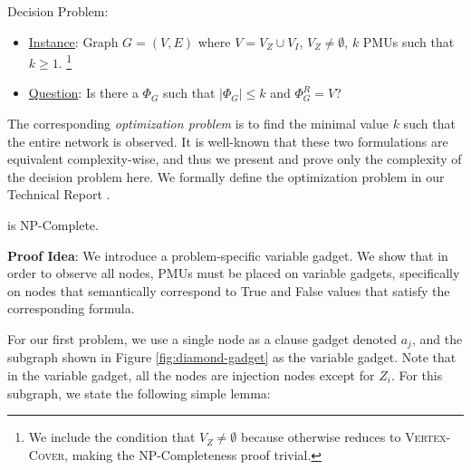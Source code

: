 \full Decision Problem:
\begin{itemize}
	\item \underline{Instance}: Graph $G=(V,E)$ where $V=V_Z \cup V_I$, $V_Z \neq \emptyset$, $k$ PMUs such that $k \geq 1$.
	{\footnote {\small We include the condition that $V_Z \neq \emptyset$ because otherwise \full reduces to \textsc{Vertex-Cover}, making the NP-Completeness
	proof trivial.}}

	\item \underline{Question}: Is there a $\Phi_G$ such that $|\Phi_G| \leq k$ and $\Phi^R_G = V$?
\end{itemize}

The corresponding {\em optimization problem} is to find the minimal value $k$ such that the entire network is observed. It is well-known that these two formulations are equivalent complexity-wise, 
and thus we present and prove only the complexity of the decision problem here. 
We formally define the optimization problem in our Technical Report \cite{Tech12}.

\begin{theorem}
\full is NP-Complete. %
\label{thm:npc-full}
\end{theorem}

{\bf Proof Idea}:  We introduce a problem-specific variable gadget. We show that in order to observe all nodes, PMUs must be placed on variable gadgets, specifically on
nodes that semantically correspond to True and False values that satisfy the corresponding \sat formula. 

For our first problem, we use a single node as a clause gadget denoted $a_j$, and the subgraph shown in Figure \ref{fig:diamond-gadget} as the variable gadget. Note that in the variable gadget, all the nodes are injection nodes except for $Z_i$. For this subgraph, we state the following simple lemma:

